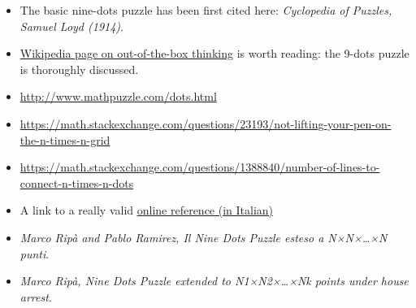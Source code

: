 \documentclass[11pt]{article}
\begin{document}
\begin{itemize}
	\item
		The basic nine-dots puzzle has been first cited here: \emph{Cyclopedia of Puzzles, Samuel Loyd (1914)}.
	\item
	\href{https://en.wikipedia.org/wiki/Thinking_outside_the_box}{Wikipedia page on out-of-the-box thinking} is worth reading: the 9-dots puzzle is thoroughly discussed.
	\item
		\href{http://www.mathpuzzle.com/dots.html}{http://www.mathpuzzle.com/dots.html}
	\item
		\href{https://math.stackexchange.com/questions/23193/not-lifting-your-pen-on-the-n-times-n-grid}{https://math.stackexchange.com/questions/23193/not-lifting-your-pen-on-the-n-times-n-grid}
	\item
		\href{https://math.stackexchange.com/questions/1388840/number-of-lines-to-connect-n-times-n-dots}{https://math.stackexchange.com/questions/1388840/number-of-lines-to-connect-n-times-n-dots} %
	\item
		A link to a really valid \href{http://utenti.quipo.it/base5/geopiana/loyd9punti4linee.htm}{online reference (in Italian)}
	\item
		\emph{Marco Ripà and Pablo Ramirez, Il Nine Dots Puzzle esteso a N×N×\ldots×N punti}.
	\item
		\emph{Marco Ripà, Nine Dots Puzzle extended to N1×N2×\ldots×Nk points 	under house arrest}.
\end{itemize}
\end{document}
